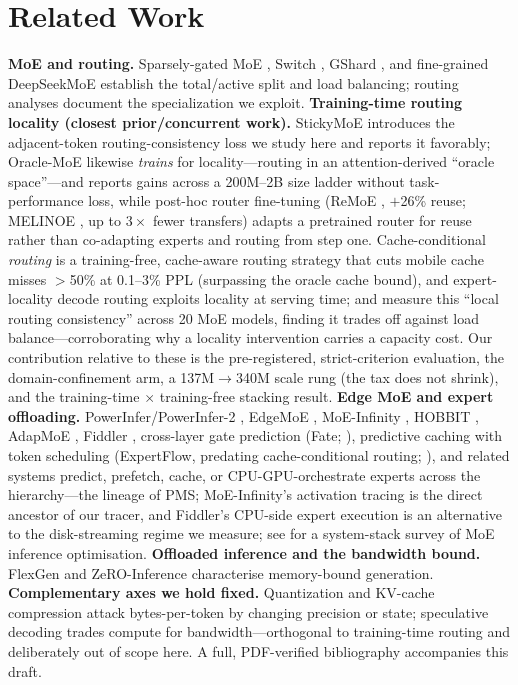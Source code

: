 \documentclass[11pt]{article}
\begin{document}
\section{Related Work}
\label{sec:related}
\textbf{MoE and routing.} Sparsely-gated MoE \citep{shazeer2017moe}, Switch
\citep{fedus2022switch}, GShard \citep{lepikhin2021gshard}, and fine-grained
DeepSeekMoE \citep{dai2024deepseekmoe} establish the total/active split and load
balancing; routing analyses \citep{dai2024deepseekmoe} document the specialization we
exploit. \textbf{Training-time routing locality (closest prior/concurrent work).}
StickyMoE \citep{kayyam2026sticky} introduces the adjacent-token routing-consistency
loss we study here and reports it favorably; Oracle-MoE \citep{zhou2025oraclemoe}
likewise \emph{trains} for locality---routing in an attention-derived ``oracle
space''---and reports gains across a 200M--2B size ladder without task-performance
loss, while post-hoc router fine-tuning (ReMoE \citep{zhu2026remoe}, $+$26\% reuse;
MELINOE \citep{raje2026melinoe}, up to $3\times$ fewer transfers) adapts a pretrained
router for reuse rather than co-adapting experts and routing from step one.
Cache-conditional \emph{routing}
\citep{cachecond2024} is a training-free, cache-aware routing strategy that cuts mobile
cache misses $>$50\% at 0.1--3\% PPL (surpassing the oracle cache bound), and
expert-locality decode routing \citep{eldr2026} exploits locality at serving time; and
\citet{liang2026localrouting} measure this ``local routing consistency'' across 20 MoE
models, finding it trades off against load balance---corroborating why a locality
intervention carries a capacity cost. Our contribution relative
to these is the pre-registered, strict-criterion evaluation, the domain-confinement
arm, a 137M$\to$340M scale rung (the tax does not shrink), and the training-time
$\times$ training-free stacking result. \textbf{Edge MoE and expert offloading.} PowerInfer/PowerInfer-2
\citep{song2024powerinfer,xue2024powerinfer2}, EdgeMoE \citep{yi2023edgemoe}, MoE-Infinity
\citep{xue2024moeinfinity}, HOBBIT \citep{tang2024hobbit}, AdapMoE \citep{zhong2024adapmoe},
Fiddler \citep{kamahori2025fiddler}, cross-layer gate prediction (Fate;
\citealp{fang2025fate}), predictive caching with token scheduling (ExpertFlow,
predating cache-conditional routing; \citealp{he2024expertflow}), and related
systems predict, prefetch, cache, or
CPU-GPU-orchestrate experts across the hierarchy---the lineage of PMS; MoE-Infinity's
activation tracing is the direct ancestor of our tracer, and Fiddler's CPU-side expert
execution is an alternative to the disk-streaming regime we measure; see
\citet{liu2025moesurvey} for a system-stack survey of MoE inference optimisation.
\textbf{Offloaded inference and the bandwidth bound.} FlexGen \citep{sheng2023flexgen}
and ZeRO-Inference characterise memory-bound generation. \textbf{Complementary
axes we hold fixed.} Quantization \citep{frantar2023gptq,lin2024awq,ma2024bitnet158} and KV-cache
compression \citep{xiao2024streamingllm} attack bytes-per-token by changing precision or
state; speculative decoding \citep{leviathan2023speculative,li2024eagle} trades compute for
bandwidth---orthogonal to training-time routing and deliberately out of scope
here. A full, PDF-verified bibliography accompanies this draft.
\end{document}
